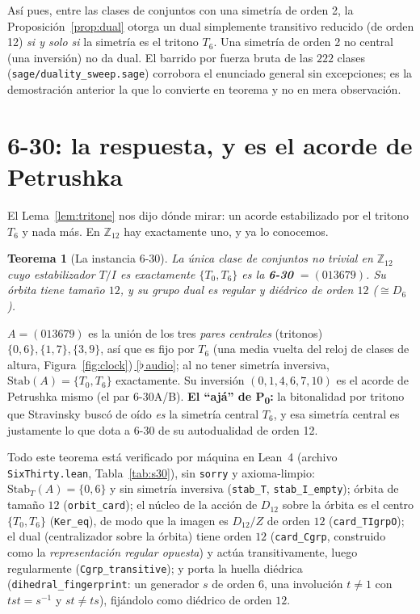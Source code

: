 \documentclass[11pt]{article}
\newtheorem{theorem}{Teorema}
\newcommand{\lean}[1]{\texttt{#1}}
\newcommand{\Ztwelve}{\mathbb{Z}_{12}}
\newcommand{\Dgrp}[1]{D_{#1}}
\newcommand{\Stab}{\mathrm{Stab}}
\newcommand{\audiobase}{https://github.com/karlesmarin/music-math/raw/main/media}
\newcommand{\audio}[1]{\href{\audiobase/#1}{\textcolor{ctA}{\footnotesize\,[$\flat$\,audio]}}}
\begin{document}
Así pues, entre las clases de conjuntos con una simetría de orden 2, la Proposición~\ref{prop:dual}
otorga un dual simplemente transitivo reducido (de orden 12) \emph{si y solo si} la simetría es el
tritono $T_6$. Una simetría de orden 2 no central (una inversión) no da dual. El barrido por fuerza bruta
de las $222$ clases (\lean{sage/duality\_sweep.sage}) corrobora el enunciado general sin excepciones; es
la demostración anterior la que lo convierte en teorema y no en mera observación.

\section{6-30: la respuesta, y es el acorde de Petrushka}\label{sec:sixthirty}

El Lema~\ref{lem:tritone} nos dijo dónde mirar: un acorde estabilizado por el tritono $T_6$ y nada más.
En $\Ztwelve$ hay exactamente uno, y ya lo conocemos.

\begin{theorem}[La instancia 6-30]\label{thm:sixthirty}
La única clase de conjuntos no trivial en $\Ztwelve$ cuyo estabilizador $T/I$ es exactamente
$\{T_0,T_6\}$ es la \textbf{6-30} $=(013679)$. Su órbita tiene tamaño $12$, y su grupo dual es regular y
diédrico de orden $12$ ($\cong\Dgrp{6}$).
\end{theorem}

$A=(013679)$ es la unión de los tres \emph{pares centrales} (tritonos) $\{0,6\},\{1,7\},\{3,9\}$, así que
es fijo por $T_6$ (una media vuelta del reloj de clases de altura,
Figura~\ref{fig:clock})\,\audio{t6_symmetry.wav}; al no tener simetría inversiva,
$\Stab(A)=\{T_0,T_6\}$ exactamente. Su inversión $(0,1,4,6,7,10)$ es el acorde de
Petrushka mismo (el par $6$-30A/B). \textbf{El ``ajá'' de P\textsubscript{0}:} la bitonalidad por tritono
que Stravinsky buscó de oído \emph{es} la simetría central $T_6$, y esa simetría central es justamente lo
que dota a 6-30 de su autodualidad de orden 12.

Todo este teorema está verificado por máquina en Lean~4 (archivo \lean{SixThirty.lean},
Tabla~\ref{tab:s30}), sin \lean{sorry} y axioma-limpio: $\Stab_T(A)=\{0,6\}$ y sin simetría inversiva
(\lean{stab\_T}, \lean{stab\_I\_empty}); órbita de tamaño $12$ (\lean{orbit\_card}); el núcleo de la
acción de $\Dgrp{12}$ sobre la órbita es el centro $\{T_0,T_6\}$ (\lean{Ker\_eq}), de modo que la imagen
es $\Dgrp{12}/Z$ de orden $12$ (\lean{card\_TIgrpO}); el dual (centralizador sobre la órbita) tiene orden
$12$ (\lean{card\_Cgrp}, construido como la \emph{representación regular opuesta}) y actúa
transitivamente, luego regularmente (\lean{Cgrp\_transitive}); y porta la huella diédrica
(\lean{dihedral\_fingerprint}: un generador $s$ de orden $6$, una involución $t\ne1$ con $tst=s^{-1}$ y
$st\ne ts$), fijándolo como diédrico de orden $12$.
\end{document}
